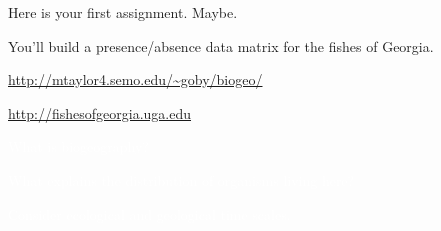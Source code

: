 \documentclass[t]{beamer}
\begin{document}
{
\begin{frame}[t,plain]{Here is your first assignment. Maybe.}

	\hangpara You'll build a presence/absence data matrix for the fishes of Georgia.

	\hangpara \url{http://mtaylor4.semo.edu/~goby/biogeo/}
	
	\hangpara \url{http://fishesofgeorgia.uga.edu}
	
\end{frame}
}

{
\begin{frame}[b,plain]{\textcolor{white}{What is biogeography?}}

\end{frame}
}


{
\begin{frame}[t,plain]{\textcolor{white}{What explains the distribution of organisms living here?}}

	\hangpara\textcolor{white}{Consider ecological and geological time scales.}
\end{frame}
}

{
\begin{frame}[t,plain]
\end{frame}
}

{
\begin{frame}[t,plain]
\end{frame}
}

{
\begin{frame}[t,plain]
\end{frame}
}

{
\begin{frame}[t,plain]
\end{frame}
}

{
\begin{frame}[t,plain]
\end{frame}
}
\end{document}
